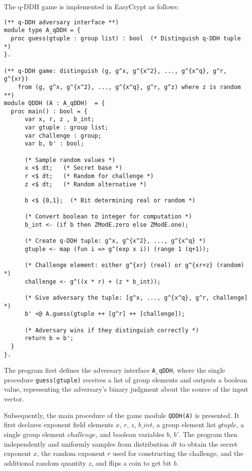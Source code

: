 The q-DDH game is implemented in EasyCrypt as follows:

\begin{lstlisting}[style=easycrypt, caption=q-DDH Game Implementation, breaklines=true, breakatwhitespace=true, frame=single, keepspaces=true]
(** q-DDH adversary interface **)
module type A_qDDH = {
  proc guess(gtuple : group list) : bool  (* Distinguish q-DDH tuple *)
}.

(** q-DDH game: distinguish (g, g^x, g^{x^2}, ..., g^{x^q}, g^r, g^{xr}) 
    from (g, g^x, g^{x^2}, ..., g^{x^q}, g^r, g^z) where z is random **)
module QDDH (A : A_qDDH)  = {
  proc main() : bool = {
      var x, r, z , b_int;
      var gtuple : group list;
      var challenge : group;
      var b, b' : bool;

      (* Sample random values *)
      x <$ dt;   (* Secret base *)
      r <$ dt;   (* Random for challenge *)
      z <$ dt;   (* Random alternative *)

      b <$ {0,1};  (* Bit determining real or random *)
    
      (* Convert boolean to integer for computation *)
      b_int <- (if b then ZModE.zero else ZModE.one);

      (* Create q-DDH tuple: g^x, g^{x^2}, ..., g^{x^q} *)
      gtuple <- map (fun i => g^(exp x i)) (range 1 (q+1));

      (* Challenge element: either g^{xr} (real) or g^{xr+z} (random) *)
      challenge <- g^((x * r) + (z * b_int));
      
      (* Give adversary the tuple: [g^x, ..., g^{x^q}, g^r, challenge] *)
      b' <@ A.guess(gtuple ++ [g^r] ++ [challenge]);

      (* Adversary wins if they distinguish correctly *)
      return b = b';
  }
}.
\end{lstlisting}

The program first defines the adversary interface \texttt{A\_qDDH}, where the single procedure \texttt{guess(gtuple)} receives a list of group elements and outputs a boolean value, representing the adversary's binary judgment about the source of the input vector.

Subsequently, the main procedure of the game module \texttt{QDDH(A)} is presented. It first declares exponent field elements $x$, $r$, $z$, $b\_int$, a group element list $gtuple$, a single group element $challenge$, and boolean variables $b$, $b'$. The program then independently and uniformly samples from distribution $dt$ to obtain the secret exponent $x$, the random exponent $r$ used for constructing the challenge, and the additional random quantity $z$, and flips a coin to get bit $b$.

